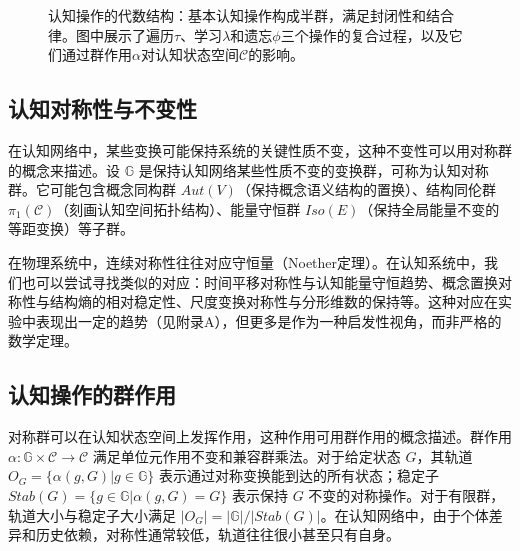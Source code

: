 \documentclass[12pt,a4paper]{article}
\newcommand{\cognitivespace}{\mathcal{C}}
\newcommand{\cognitivegroup}{\mathbb{G}}
\begin{document}
\begin{figure}[H]
\caption{认知操作的代数结构：基本认知操作构成半群，满足封闭性和结合律。图中展示了遍历$\tau$、学习$\lambda$和遗忘$\phi$三个操作的复合过程，以及它们通过群作用$\alpha$对认知状态空间$\mathcal{C}$的影响。}
\label{fig:cognitive_semigroup}
\end{figure}

\subsection{认知对称性与不变性}

在认知网络中，某些变换可能保持系统的关键性质不变，这种不变性可以用对称群的概念来描述。设 $\cognitivegroup$ 是保持认知网络某些性质不变的变换群，可称为认知对称群。它可能包含概念同构群 $Aut(V)$（保持概念语义结构的置换）、结构同伦群 $\pi_1(\cognitivespace)$（刻画认知空间拓扑结构）、能量守恒群 $Iso(E)$（保持全局能量不变的等距变换）等子群。

在物理系统中，连续对称性往往对应守恒量（Noether定理）。在认知系统中，我们也可以尝试寻找类似的对应：时间平移对称性与认知能量守恒趋势、概念置换对称性与结构熵的相对稳定性、尺度变换对称性与分形维数的保持等。这种对应在实验中表现出一定的趋势（见附录A），但更多是作为一种启发性视角，而非严格的数学定理。

\subsection{认知操作的群作用}

对称群可以在认知状态空间上发挥作用，这种作用可用群作用的概念描述。群作用 $\alpha: \cognitivegroup \times \cognitivespace \rightarrow \cognitivespace$ 满足单位元作用不变和兼容群乘法。对于给定状态 $G$，其轨道 $O_G = \{\alpha(g, G) | g \in \cognitivegroup\}$ 表示通过对称变换能到达的所有状态；稳定子 $Stab(G) = \{g \in \cognitivegroup | \alpha(g, G) = G\}$ 表示保持 $G$ 不变的对称操作。对于有限群，轨道大小与稳定子大小满足 $|O_G| = |\cognitivegroup|/|Stab(G)|$。在认知网络中，由于个体差异和历史依赖，对称性通常较低，轨道往往很小甚至只有自身。
\end{document}
